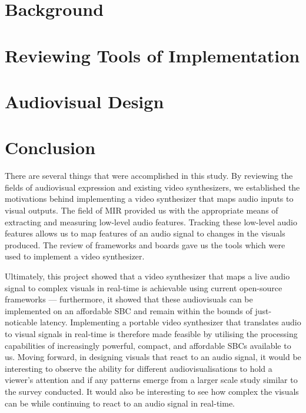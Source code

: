 \documentclass{report}
\begin{document}
\chapter{Background}\label{chap:background}




\chapter{Reviewing Tools of Implementation}\label{chap:toolreview}



\chapter{Audiovisual Design}\label{chap:avdesign}






\chapter{Conclusion}
There are several things that were accomplished in this study. By reviewing the fields of audiovisual expression and existing video synthesizers, we established the motivations behind implementing a video synthesizer that maps audio inputs to visual outputs. The field of MIR provided us with the appropriate means of extracting and measuring low-level audio features. Tracking these low-level audio features allows us to map features of an audio signal to changes in the visuals produced. The review of frameworks and boards gave us the tools which were used to implement a video synthesizer.

Ultimately, this project showed that a video synthesizer that maps a live audio signal to complex visuals in real-time is achievable using current open-source frameworks --- furthermore, it showed that these audiovisuals can be implemented on an affordable SBC and remain within the bounds of just-noticable latency. Implementing a portable video synthesizer that translates audio to visual signals in real-time is therefore made feasible by utilising the processing capabilities of increasingly powerful, compact, and affordable SBCs available to us. Moving forward, in designing visuals that react to an audio signal, it would be interesting to observe the ability for different audiovisualisations to hold a viewer's attention and if any patterns emerge from a larger scale study similar to the survey conducted. It would also be interesting to see how complex the visuals can be while continuing to react to an audio signal in real-time.
\printbibliography

\begin{appendices}
  
\end{appendices}
\end{document}
